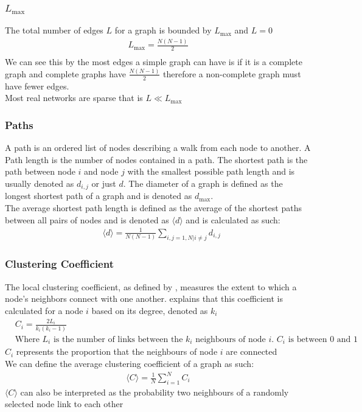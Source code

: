 \documentclass{article}
\begin{document}
        \subsubsection{$L_{\text{max}}$}
            The total number of edges $L$ for a graph is bounded by $L_{\text{max}}$ and $L=0$
            \begin{align*}
                L_{\text{max}} =  \frac{N(N-1)}{2}\\
            \end{align*}
            We can see this by the most edges a simple graph can have is if it is a complete graph and complete graphs have $\frac{N(N-1)}{2}$ therefore a non-complete graph must have fewer edges.\\
            Most real networks are sparse that is $L\ll L_{\text{max}}$\\
        \subsubsection{Paths}
        A path is an ordered list of nodes describing a walk from each node to another. A Path length is the number of nodes contained in a path. The shortest path is the path between node $i$ and node $j$ with the smallest possible path length and is usually denoted as $d_{i,j}$ or just $d$. The diameter of a graph is defined as the longest shortest path of a graph and is denoted as $d_{\text{max}}$.\\
        The average shortest path length is defined as the average of the shortest paths between all pairs of nodes and is denoted as $\langle d \rangle$ and is calculated as such:
        \begin{align*}
            &\langle d \rangle = \frac{1}{N(N-1)}\sum_{i,j=1,N | i\neq j}d_{i,j}
        \end{align*}

        \subsubsection{Clustering Coefficient}
        The local clustering coefficient, as defined by \parencite{Watts1998}, measures the extent to which a node's neighbors connect with one another. \parencite{barabasi2013network} explains that this coefficient is calculated for a node $i$ based on its degree, denoted as $k_i$
            \begin{align*}
                &C_{i} = \frac{2L_{i}}{k_{i}(k_{i}-1)}\\
                &\text{Where $L_{i}$ is the number of links between the $k_i$ neighbours of node $i$. $C_{i}$ is between $0$ and $1$}
            \end{align*}
            $C_i$ represents the proportion that the neighbours of node $i$ are connected\\
            We can define the average clustering coefficient of a graph as such:
            \begin{align*}
                \langle C \rangle = \frac{1}{N}\sum_{i=1}^{N}C_{i}
            \end{align*}
            $\langle C \rangle$ can also be interpreted as the probability two neighbours of a randomly selected node link to each other
\end{document}
